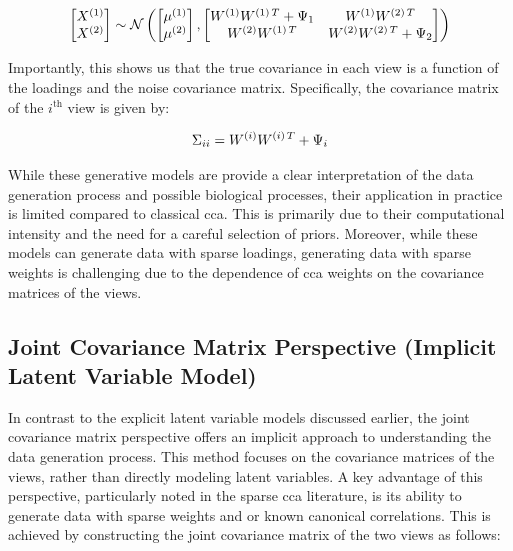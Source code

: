 \begin{align}
    \begin{bmatrix}
        X^{(1)} \\ X^{(2)}
    \end{bmatrix} \sim \mathcal{N} \left( \begin{bmatrix}
                                              \mu^{(1)} \\ \mu^{(2)}
    \end{bmatrix}, \begin{bmatrix}
                       W^{(1)}W^{(1)\,T} + \Psi_1 & W^{(1)}W^{(2)\,T} \\ W^{(2)}W^{(1)\,T} & W^{(2)}W^{(2)\,T} + \Psi_2
    \end{bmatrix} \right)
\end{align}

Importantly, this shows us that the true covariance in each view is a function of the \gls{loadings} and the noise covariance matrix.
Specifically, the covariance matrix of the $i^{\text{th}}$ view is given by:

\begin{align}
    \Sigma_{ii} = W^{(i)}W^{(i)\,T} + \Psi_i
\end{align}

While these generative models are provide a clear interpretation of the data generation process and possible biological processes, their application in practice is limited compared to classical \acrshort{cca}.
This is primarily due to their computational intensity and the need for a careful selection of priors.
Moreover, while these models can generate data with sparse loadings, generating data with sparse weights is challenging due to the dependence of \acrshort{cca} weights on the covariance matrices of the views.

\subsection{Joint Covariance Matrix Perspective (Implicit Latent Variable Model)}\label{subsubsec:a-joint-covariance-matrix-perspective}

In contrast to the explicit latent variable models discussed earlier, the joint covariance matrix perspective offers an implicit approach to understanding the data generation process.
This method focuses on the covariance matrices of the views, rather than directly modeling latent variables.
A key advantage of this perspective, particularly noted in the sparse \acrshort{cca} literature, is its ability to generate data with sparse weights and or known canonical correlations.
This is achieved by constructing the joint covariance matrix of the two views as follows:

